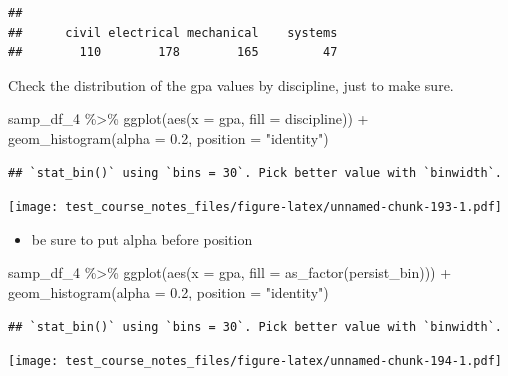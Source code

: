\documentclass[
]{book}
\newenvironment{Shaded}{\begin{snugshade}}{\end{snugshade}}
\newcommand{\AttributeTok}[1]{\textcolor[rgb]{0.77,0.63,0.00}{#1}}
\newcommand{\FloatTok}[1]{\textcolor[rgb]{0.00,0.00,0.81}{#1}}
\newcommand{\FunctionTok}[1]{\textcolor[rgb]{0.00,0.00,0.00}{#1}}
\newcommand{\NormalTok}[1]{#1}
\newcommand{\SpecialCharTok}[1]{\textcolor[rgb]{0.00,0.00,0.00}{#1}}
\newcommand{\StringTok}[1]{\textcolor[rgb]{0.31,0.60,0.02}{#1}}
\providecommand{\tightlist}{%
  \setlength{\itemsep}{0pt}\setlength{\parskip}{0pt}}
\begin{document}
\begin{verbatim}
## 
##      civil electrical mechanical    systems 
##        110        178        165         47
\end{verbatim}

Check the distribution of the gpa values by discipline, just to make sure.

\begin{Shaded}
\begin{Highlighting}[]
\NormalTok{samp\_df\_4 }\SpecialCharTok{\%\textgreater{}\%} 
  \FunctionTok{ggplot}\NormalTok{(}\FunctionTok{aes}\NormalTok{(}\AttributeTok{x =}\NormalTok{ gpa, }\AttributeTok{fill =}\NormalTok{ discipline)) }\SpecialCharTok{+}
  \FunctionTok{geom\_histogram}\NormalTok{(}\AttributeTok{alpha =} \FloatTok{0.2}\NormalTok{, }\AttributeTok{position =} \StringTok{"identity"}\NormalTok{)}
\end{Highlighting}
\end{Shaded}

\begin{verbatim}
## `stat_bin()` using `bins = 30`. Pick better value with `binwidth`.
\end{verbatim}

\texttt{[image: test\_course\_notes\_files/figure-latex/unnamed-chunk-193-1.pdf]}

\begin{itemize}
\tightlist
\item
  be sure to put alpha before position
\end{itemize}

\begin{Shaded}
\begin{Highlighting}[]
\NormalTok{samp\_df\_4 }\SpecialCharTok{\%\textgreater{}\%} 
  \FunctionTok{ggplot}\NormalTok{(}\FunctionTok{aes}\NormalTok{(}\AttributeTok{x =}\NormalTok{ gpa, }\AttributeTok{fill =} \FunctionTok{as\_factor}\NormalTok{(persist\_bin))) }\SpecialCharTok{+}
  \FunctionTok{geom\_histogram}\NormalTok{(}\AttributeTok{alpha =} \FloatTok{0.2}\NormalTok{, }\AttributeTok{position =} \StringTok{"identity"}\NormalTok{)}
\end{Highlighting}
\end{Shaded}

\begin{verbatim}
## `stat_bin()` using `bins = 30`. Pick better value with `binwidth`.
\end{verbatim}

\texttt{[image: test\_course\_notes\_files/figure-latex/unnamed-chunk-194-1.pdf]}
\end{document}
